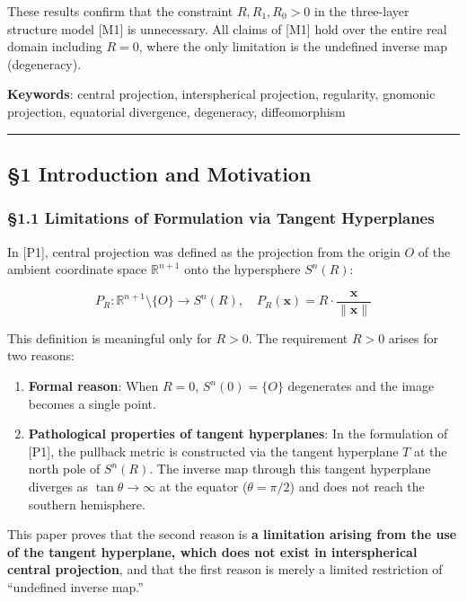 \documentclass[
  a4paper]{article}
\providecommand{\tightlist}{%
  \setlength{\itemsep}{0pt}\setlength{\parskip}{0pt}}
\begin{document}
These results confirm that the constraint \(R, R_1, R_0 > 0\) in the
three-layer structure model {[}M1{]} is unnecessary. All claims of
{[}M1{]} hold over the entire real domain including \(R = 0\), where the
only limitation is the undefined inverse map (degeneracy).

\textbf{Keywords}: central projection, interspherical projection,
regularity, gnomonic projection, equatorial divergence, degeneracy,
diffeomorphism

\begin{center}\rule{0.5\linewidth}{0.5pt}\end{center}

\subsection{§1 Introduction and
Motivation}\label{introduction-and-motivation}

\subsubsection{§1.1 Limitations of Formulation via Tangent
Hyperplanes}\label{limitations-of-formulation-via-tangent-hyperplanes}

In {[}P1{]}, central projection was defined as the projection from the
origin \(O\) of the ambient coordinate space \(\mathbb{R}^{n+1}\) onto
the hypersphere \(S^n(R)\):

\[
P_R : \mathbb{R}^{n+1} \setminus \{O\} \to S^n(R), \quad P_R(\mathbf{x}) = R \cdot \frac{\mathbf{x}}{\|\mathbf{x}\|}
\]

This definition is meaningful only for \(R > 0\). The requirement
\(R > 0\) arises for two reasons:

\begin{enumerate}
\def\labelenumi{\arabic{enumi}.}
\tightlist
\item
  \textbf{Formal reason}: When \(R = 0\), \(S^n(0) = \{O\}\) degenerates
  and the image becomes a single point.
\item
  \textbf{Pathological properties of tangent hyperplanes}: In the
  formulation of {[}P1{]}, the pullback metric is constructed via the
  tangent hyperplane \(T\) at the north pole of \(S^n(R)\). The inverse
  map through this tangent hyperplane diverges as
  \(\tan\theta \to \infty\) at the equator (\(\theta = \pi/2\)) and does
  not reach the southern hemisphere.
\end{enumerate}

This paper proves that the second reason is \textbf{a limitation arising
from the use of the tangent hyperplane, which does not exist in
interspherical central projection}, and that the first reason is merely
a limited restriction of ``undefined inverse map.''
\end{document}
